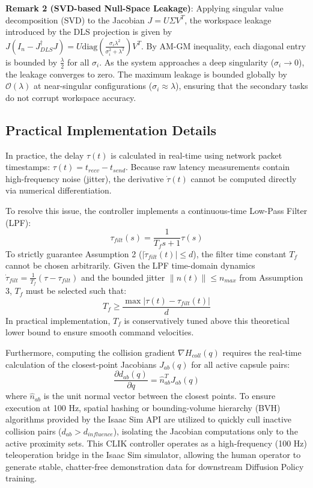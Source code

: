 \documentclass[letterpaper,journal]{IEEEtran}
\begin{document}
\textbf{Remark 2 (SVD-based Null-Space Leakage)}: Applying singular value decomposition (SVD) to the Jacobian $J = U \Sigma V^T$, the workspace leakage introduced by the DLS projection is given by $J \left( I_n - J^{\dagger}_{DLS}J \right) = U \text{diag}\left( \frac{\sigma_i \lambda^2}{\sigma_i^2 + \lambda^2} \right) V^T$. By AM-GM inequality, each diagonal entry is bounded by $\frac{\lambda}{2}$ for all $\sigma_i$. As the system approaches a deep singularity ($\sigma_i \to 0$), the leakage converges to zero. The maximum leakage is bounded globally by $\mathcal{O}(\lambda)$ at near-singular configurations ($\sigma_i \approx \lambda$), ensuring that the secondary tasks do not corrupt workspace accuracy.

\subsection{Practical Implementation Details}
In practice, the delay $\tau(t)$ is calculated in real-time using network packet timestamps: $\tau(t) = t_{recv} - t_{send}$. Because raw latency measurements contain high-frequency noise (jitter), the derivative $\dot{\tau}(t)$ cannot be computed directly via numerical differentiation. 

To resolve this issue, the controller implements a continuous-time Low-Pass Filter (LPF):
\begin{equation}
\tau_{filt}(s) = \frac{1}{T_f s + 1} \tau(s)
\end{equation}
To strictly guarantee Assumption 2 ($|\dot{\tau}_{filt}(t)| \le d$), the filter time constant $T_f$ cannot be chosen arbitrarily. Given the LPF time-domain dynamics $\dot{\tau}_{filt} = \frac{1}{T_f} (\tau - \tau_{filt})$ and the bounded jitter $\|n(t)\| \le n_{max}$ from Assumption 3, $T_f$ must be selected such that:
\begin{equation}
T_f \ge \frac{\max |\tau(t) - \tau_{filt}(t)|}{d}
\end{equation}
In practical implementation, $T_f$ is conservatively tuned above this theoretical lower bound to ensure smooth command velocities.

Furthermore, computing the collision gradient $\nabla H_{coll}(q)$ requires the real-time calculation of the closest-point Jacobians $J_{ab}(q)$ for all active capsule pairs:
\begin{equation}
\frac{\partial d_{ab}(q)}{\partial q} = \hat{n}_{ab}^T J_{ab}(q)
\end{equation}
where $\hat{n}_{ab}$ is the unit normal vector between the closest points. To ensure execution at 100 Hz, spatial hashing or bounding-volume hierarchy (BVH) algorithms provided by the Isaac Sim API are utilized to quickly cull inactive collision pairs ($d_{ab} > d_{influence}$), isolating the Jacobian computations only to the active proximity sets. This CLIK controller operates as a high-frequency (100 Hz) teleoperation bridge in the Isaac Sim simulator, allowing the human operator to generate stable, chatter-free demonstration data for downstream Diffusion Policy training.
\end{document}
